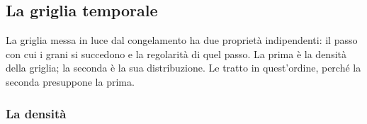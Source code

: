 %
%

\subsection{La griglia temporale}\label{sec:griglia}

La griglia messa in luce dal congelamento ha due proprietà
indipendenti: il passo con cui i grani si succedono e la regolarità di
quel passo. La prima è la densità della griglia; la seconda è la sua
distribuzione. Le tratto in quest'ordine, perché la seconda presuppone
la prima.

\subsubsection{La densità}

